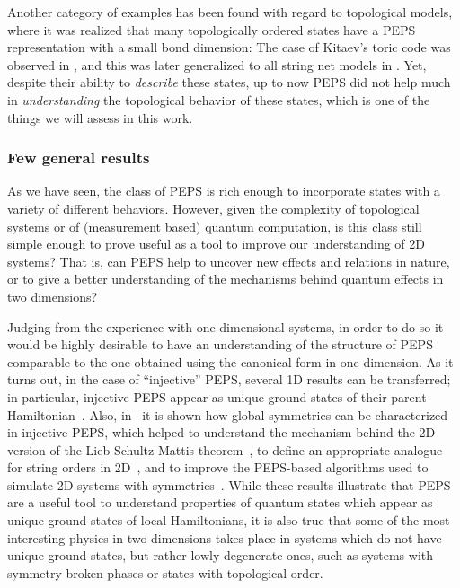 \documentclass{article}
\theoremstyle{plain}
\theoremstyle{definition}
\numberwithin{equation}{section}  %
\begin{document}
Another category of examples has been found with regard to topological
models, where it was realized that many topologically ordered states have
a PEPS representation with a small bond dimension: The case of Kitaev's
toric code was observed in \cite{frank:comp-power-of-peps}, and this was
later generalized to all string net models in \cite{vidal:stringnet-peps}.
Yet, despite their ability to \emph{describe} these states, up to now PEPS
did not help much in \emph{understanding} the topological behavior of
these states, which is one of the things we will assess in this work.

\subsubsection{Few general results}

As we have seen, the class of PEPS is rich enough to incorporate states
with a variety of different behaviors. However, given the complexity of
topological systems or of (measurement based) quantum computation, is this
class still simple enough to prove useful as a tool to improve our
understanding of 2D systems? That is, can PEPS help to uncover new effects
and relations in nature, or to give a better understanding  of the
mechanisms behind quantum effects in two dimensions?

Judging from the experience with one-dimensional systems, in order to do
so it would be highly desirable to have an understanding of the structure
of PEPS comparable to the one obtained using the canonical form in one
dimension.  As it turns out, in the case of ``injective'' PEPS, several 1D
results can be transferred; in particular, injective PEPS appear as unique
ground states of their parent
Hamiltonian~\cite{perez-garcia:parent-ham-2d}.  Also,
in~\cite{perez-garcia:inj-peps-syms} it is shown how global symmetries can
be characterized in injective PEPS, which helped to understand the
mechanism behind the 2D version of the Lieb-Schultz-Mattis
theorem~\cite{hastings:liebschultzmattis-2d}, to define an appropriate
analogue for string orders in 2D~\cite{david:stringorder-1d}, and  to
improve the PEPS-based algorithms used to simulate 2D systems with
symmetries~\cite{singh:tns-decomp-symmetry}.  While these results
illustrate that PEPS are a useful tool to understand properties of quantum
states which appear as unique ground states of local Hamiltonians, it is
also true that some of the most interesting physics in two dimensions
takes place in systems which do not have unique ground states, but rather
lowly degenerate ones, such as systems with symmetry broken phases or
states with topological order.
\end{document}
